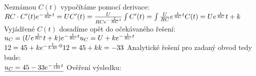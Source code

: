 \Large{Neznámou \(C(t)\) vypočítáme pomocí derivace:}\\
\begin{math}
\newline
    RC\cdot C'(t)e^{-\frac{1}{RC}t} = U\\ 
    C'(t)=\frac{U}{RCe^{-\frac{1}{RC}t}}\\ \\
    \int  C'(t) = \int \frac{U}{RC}e^{\frac{1}{RC}t}\\ \\
    C(t)=Ue^{\frac{1}{RC}}t+k\\ \\
\end{math}
\Large{Vyjádřené \(C(t)\) dosadíme opět do očekávaného řešení:}\\ 
\begin{math}
\newline
    u_C = (Ue^{\frac{1}{RC}}t+k)e^{-\frac{1}{RC}t}\\ \\
    u_C = U + ke^{-\frac{1}{RC}t}\\ \\
\end{math}
\newpage
{}
\begin{math}
\newline
    12=45+ke^{-\frac{1}{5\cdot 30}\cdot 0}\\
    12=45+k\\ \\
    k = -33\\ \\
\end{math}
\Large{Analytické řešení pro zadaný obvod tedy bude:}\\
\begin{math}
\newline
    \underline{u_C = 45 -33e^{-\frac{1}{150}t}}\\ \\ \\
\end{math}
\Large{Ověření výsledku:}
